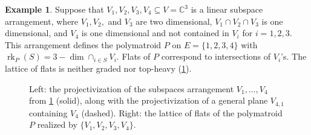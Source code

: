 \documentclass[11pt]{article}
\theoremstyle{definition}
\newtheorem{exam}[theo]{Example}
\numberwithin{equation}{section}
\newcommand{\C}{\mathbb{C}}
\DeclareMathOperator{\rk}{rk}
\begin{document}
\begin{exam}\label{intro-example}
  Suppose that $V_1,V_2,V_3,V_4 \subseteq V = \C^3$ is a linear subspace arrangement, where $V_1,V_2,$ and $V_3$ are two dimensional, $V_1 \cap V_2 \cap V_3$ is one dimensional, and $V_4$ is one dimensional and not contained in $V_i$ for $i=1,2,3$.
  This arrangement defines the polymatroid $P$ on $E = \{1,2,3,4\}$ with $\rk_P(S) = 3 - \dim \cap_{i \in S} V_i$.
  Flats of $P$ correspond to intersections of $V_i$'s. The lattice of flats is neither graded nor top-heavy  (\cref{intro-picture}).
\begin{figure}[ht]
    \hspace{-1cm}
    \begin{minipage}{2.5in}
      \centering

      \end{minipage}
      \quad
      \begin{minipage}{2.5in}
\end{minipage}
        \caption{Left: the projectivization of the subspaces arrangement $V_1, \ldots, V_4$ from \cref{intro-example} (solid), along with the projectivization of a general plane $V_{4,1}$ containing $V_4$ (dashed). Right: the lattice of flats of the polymatroid $P$ realized by $\{V_1,V_2,V_3,V_4\}$.}
        \label{intro-picture}
      \end{figure}




\end{exam}
\end{document}
